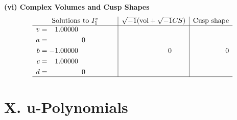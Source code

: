 \documentclass[1p]{elsarticle_modified}
\theoremstyle{definition}
\newcommand{\I}{\sqrt{-1}}
\begin{document}
\newpage\flushleft \textbf{(vi) Complex Volumes and Cusp Shapes}
$$\begin{array}{c|c|c}  
\text{Solutions to }I^v_{1}& \I (\text{vol} + \sqrt{-1}CS) & \text{Cusp shape}\\
 \hline 
\begin{aligned}
v &= \phantom{-}1.00000\phantom{ +0.000000I} \\
a &= \phantom{-0.000000 } 0 \\
b &= -1.00000\phantom{ +0.000000I} \\
c &= \phantom{-}1.00000\phantom{ +0.000000I} \\
d &= \phantom{-0.000000 } 0\end{aligned}
 & \phantom{-0.000000 } 0 & \phantom{-0.000000 } 0\\
 \hline 
 \end{array}$$\newpage
\newpage\renewcommand{\arraystretch}{1}
\centering \section*{ X. u-Polynomials}
\end{document}
